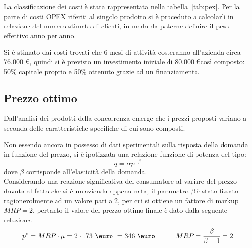 La classificazione dei costi è stata rappresentata nella tabella~\ref{tab:pex}.
Per la parte di costi OPEX riferiti al singolo prodotto si è proceduto a
calcolarli in relazione del numero stimato di clienti, in modo da poterne
definire il peso effettivo anno per anno.


Si è stimato dai costi trovati che 6 mesi di attività costeranno all’azienda
circa 76.000 \euro, quindi si è previsto un investimento iniziale di 80.000
\euro così composto: 50\% capitale proprio e 50\% ottenuto grazie ad un
finanziamento.
\subsection{Prezzo ottimo}
Dall'analisi dei prodotti della concorrenza emerge che i prezzi proposti variano
a seconda delle caratteristiche specifiche di cui sono composti.

Non essendo ancora in possesso di dati sperimentali sulla risposta della domanda
in funzione del prezzo, si è ipotizzata una relazione funzione di potenza del
tipo: 
\begin{displaymath}
q = \alpha p^{-\beta}
\end{displaymath}
dove $\beta$ corrisponde all’elasticità della domanda.\\
Considerando una reazione significativa del consumatore al variare del prezzo
dovuta al fatto che si è un’azienda appena nata, il parametro $\beta$ è stato
fissato ragionevolmente ad un valore pari a 2, per cui si ottiene un fattore di
markup $MRP=2$, pertanto il valore del prezzo ottimo finale è dato dalla
seguente relazione:
\begin{displaymath}
	p^* = MRP \cdot \mu =  2 \cdot 173 \ \mbox{\euro} \ = 346 \ \mbox{\euro}
\qquad\quad    MRP = \frac{\beta}{\beta-1} = 2
\end{displaymath}
